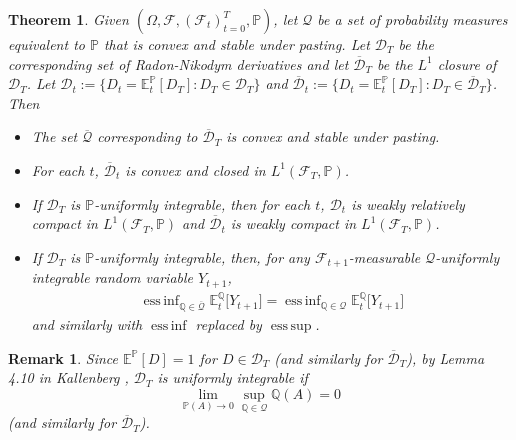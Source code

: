 \documentclass[11pt,a4paper]{article}
\newtheorem{theorem}{Theorem}
\newtheorem{remark}{Remark}
\newcommand{\E}{\mathbb{E}}
\DeclareMathOperator*{\esssup}{ess\,sup}
\DeclareMathOperator*{\essinf}{ess\,inf}
\renewcommand{\P}{\mathbb{P}}
\newcommand{\Q}{\mathbb{Q}}
\newcommand{\calF}{\mathcal{F}}
\newcommand{\calQ}{\mathcal{Q}}
\newcommand{\calD}{\mathcal{D}}
\begin{document}
\begin{theorem}\label{lem:stableclosure}
Given $(\Omega,\calF,(\calF_t)_{t=0}^{T},\P)$, let $\calQ$ be a set of probability measures equivalent to $\P$ that is convex and stable under pasting. Let $\calD_T$ be the corresponding set of Radon-Nikodym derivatives and let $\overline{\calD}_T$ be the $L^1$ closure of $\calD_T$. 
Let $\calD_t:=\{D_t=\E^{\P}_t[D_T]:D_T\in \calD_T\}$ and $\overline{\calD}_t:=\{D_t=\E^{\P}_t[D_T]:D_T\in \overline{\calD}_T\}$. 
Then 
\begin{itemize}
\item[(i)] The set $\overline{\calQ}$ corresponding to $\overline{\calD}_T$ is convex and stable under pasting.
\item[(ii)] For each $t$, $\overline{\calD}_t$ is convex and closed in $L^1(\calF_T,\P)$. 
\item[(iii)] If $\calD_T$ is $\P$-uniformly integrable, then for each $t$, $\calD_t$ is weakly relatively compact in $L^1(\calF_T,\P)$ and $\overline{\calD}_t$ is weakly compact in $L^1(\calF_T,\P)$. 
\item[(iv)] If $\calD_{T}$ is $\P$-uniformly integrable, then, for any $\calF_{t+1}$-measurable $\calQ$-uniformly integrable random variable $Y_{t+1}$, 
\begin{align*}
\essinf_{\Q \in \overline{\calQ}}\E^\Q_t\big[Y_{t+1}\big]
=\essinf_{\Q \in \calQ}\E^\Q_t\big[Y_{t+1}\big]
\end{align*}
and similarly with $\essinf$ replaced by $\esssup$. 
\end{itemize}
\end{theorem}

\begin{remark}\label{rem:ui}
Since $\E^{\P}[D]=1$ for $D\in \calD_{T}$ (and similarly for $\overline{\calD}_{T}$), by Lemma 4.10 in Kallenberg \cite{Kallenberg-02}, $\calD_{T}$ is uniformly integrable if 
$$
\lim_{\P(A)\to 0}\sup_{\Q\in \calQ}\Q(A)=0
$$
(and similarly for $\overline{\calD}_{T}$). 
\end{remark}
\end{document}
